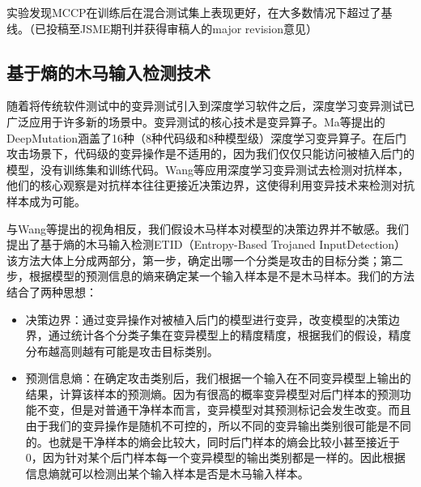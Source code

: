 \documentclass[fontset=macnew,UTF8]{article} %
\begin{document}
\begin{framed}
	\noindent 实验发现MCCP在训练后在混合测试集上表现更好，在大多数情况下超过了基线。（已投稿至JSME期刊并获得审稿人的major revision意见）
\end{framed}




\subsection{基于熵的木马输入检测技术}

随着将传统软件测试中的变异测试\cite{jia2010analysis}引入到深度学习软件\cite{shen2018munn,ma2018deepmutation}之后，深度学习变异测试已广泛应用于许多新的场景中。变异测试的核心技术是变异算子。Ma等\cite{ma2018deepmutation}提出的DeepMutation涵盖了16种（8种代码级和8种模型级）深度学习变异算子。在后门攻击场景下，代码级的变异操作是不适用的，因为我们仅仅只能访问被植入后门的模型，没有训练集和训练代码。Wang等\cite{wang2019adversarial}应用深度学习变异测试去检测对抗样本，他们的核心观察是对抗样本往往更接近决策边界，这使得利用变异技术来检测对抗样本成为可能。

与Wang\cite{wang2019adversarial}等提出的视角相反，我们假设木马样本对模型的决策边界并不敏感。我们提出了基于熵的木马输入检测ETID（Entropy-Based Trojaned InputDetection）该方法大体上分成两部分，第一步，确定出哪一个分类是攻击的目标分类；第二步，根据模型的预测信息的熵来确定某一个输入样本是不是木马样本。我们的方法结合了两种思想：

\begin{itemize}
	\item 决策边界\cite{shen2020mcp}：通过变异操作对被植入后门的模型进行变异，改变模型的决策边界，通过统计各个分类子集在变异模型上的精度精度，根据我们的假设，精度分布越高则越有可能是攻击目标类别。
	\item 预测信息熵\cite{gao2019strip}：在确定攻击类别后，我们根据一个输入在不同变异模型上输出的结果，计算该样本的预测熵。因为有很高的概率变异模型对后门样本的预测功能不变，但是对普通干净样本而言，变异模型对其预测标记会发生改变。而且由于我们的变异操作是随机不可控的，所以不同的变异输出类别很可能是不同的。也就是干净样本的熵会比较大，同时后门样本的熵会比较小甚至接近于0，因为针对某个后门样本每一个变异模型的输出类别都是一样的。因此根据信息熵就可以检测出某个输入样本是否是木马输入样本。
\end{itemize}
\end{document}

